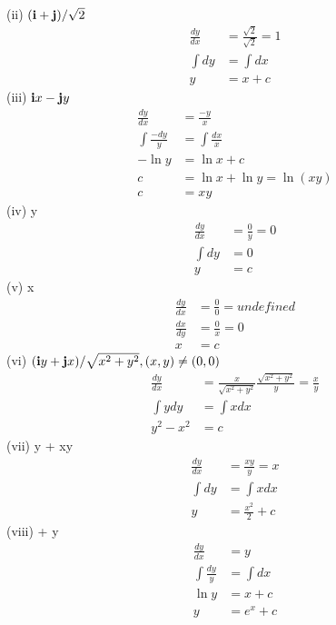 \documentclass{article}
\begin{document}
\begin{enumerate}
    (ii) $(\textbf{i} + \textbf{j})/\sqrt{2}$
    \begin{align*}
        \frac{dy}{dx} &= \frac{\sqrt{2}}{\sqrt{2}} = 1 \\
        \int{dy} &= \int{dx} \\
        y &= x + c
    \end{align*}
    (iii) $\textbf{i}x - \textbf{j}y$
    \begin{align*}
        \frac{dy}{dx} &= \frac{-y}{x} \\
        \int{\frac{-dy}{y}} &= \int{\frac{dx}{x}} \\
        -\ln{y} &= \ln{x} + c \\
        c &= \ln{x} + \ln{y} = \ln(xy) \\
        c &= xy
    \end{align*}
    (iv) y
    \begin{align*}
        \frac{dy}{dx} &= \frac{0}{y} = 0 \\
        \int{dy} &= 0 \\
        y &= c
    \end{align*}
    (v) x
    \begin{align*}
        \frac{dy}{dx} &= \frac{0}{0} = undefined \\
        \frac{dx}{dy} &= \frac{0}{x} = 0 \\
        x &= c
    \end{align*}
    (vi) $(\textbf{i}y + \textbf{j}x)/\sqrt{x^2 + y^2}, (x,y)\neq(0,0)$
    \begin{align*}
        \frac{dy}{dx} &= \frac{x}{\sqrt{x^2 + y^2}}\frac{\sqrt{x^2 + y^2}}{y} = \frac{x}{y} \\
        \int{ydy} &= \int{xdx} \\
        y^2 - x^2 &= c
    \end{align*}
    (vii) y + xy
    \begin{align*}
        \frac{dy}{dx} &= \frac{xy}{y} = x \\
        \int{dy} &= \int{xdx} \\
        y &= \frac{x^2}{2} + c
    \end{align*}
    (viii)  + y
    \begin{align*}
        \frac{dy}{dx} &= y \\
        \int{\frac{dy}{y}} &= \int{dx} \\
        \ln{y} &= x + c \\
        y &= e^x + c
    \end{align*}

\end{enumerate}
\end{document}
